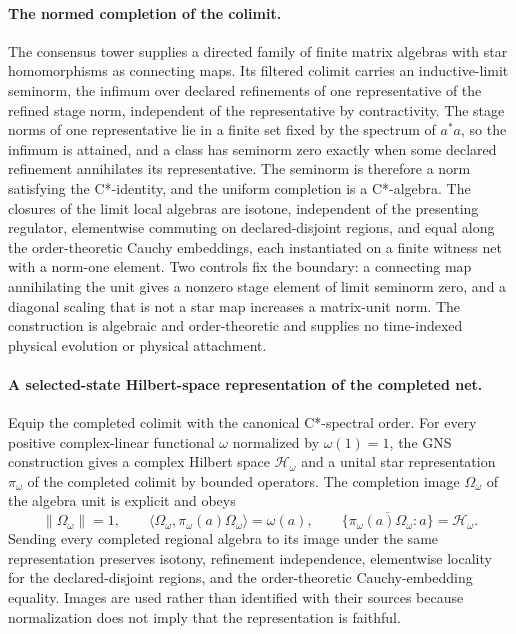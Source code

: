\documentclass[11pt]{article}
\theoremstyle{remark}
\theoremstyle{plain}
\begin{document}
\paragraph{The normed completion of the colimit.}
The consensus tower supplies a directed family of finite matrix algebras
with star homomorphisms as connecting maps. Its filtered colimit carries an
inductive-limit seminorm, the infimum over declared refinements of one
representative of the refined stage norm, independent of the
representative by contractivity. The stage norms of one representative lie
in a finite set fixed by the spectrum of \(a^*a\), so the infimum is
attained, and a class has seminorm zero exactly when some declared
refinement annihilates its representative. The seminorm is therefore a norm
satisfying the C*-identity, and the uniform completion is a C*-algebra. The
closures of the limit local algebras are isotone, independent of the
presenting regulator, elementwise commuting on declared-disjoint regions,
and equal along the order-theoretic Cauchy embeddings, each instantiated on
a finite witness net with a norm-one element. Two controls fix the boundary:
a connecting map annihilating the unit gives a nonzero stage element of
limit seminorm zero, and a diagonal scaling that is not a star map
increases a matrix-unit norm. The construction is algebraic and
order-theoretic and supplies no time-indexed physical evolution or physical
attachment.

\paragraph{A selected-state Hilbert-space representation of the completed net.}
Equip the completed colimit with the canonical C*-spectral order.  For every
positive complex-linear functional \(\omega\) normalized by
\(\omega(1)=1\), the GNS construction gives a complex Hilbert space
\(\mathcal H_\omega\) and a unital star representation
\(\pi_\omega\) of the completed colimit by bounded operators.  The completion
image \(\Omega_\omega\) of the algebra unit is explicit and obeys
\[
 \|\Omega_\omega\|=1,
 \qquad
 \langle\Omega_\omega,\pi_\omega(a)\Omega_\omega\rangle
   =\omega(a),
 \qquad
 \overline{\{\pi_\omega(a)\Omega_\omega:a\}}=\mathcal H_\omega.
\]
Sending every completed regional algebra to its image under the same
representation preserves isotony, refinement independence, elementwise
locality for the declared-disjoint regions, and the
order-theoretic Cauchy-embedding equality.  Images are used rather than
identified with their sources because normalization does not imply that the
representation is faithful.
\end{document}
